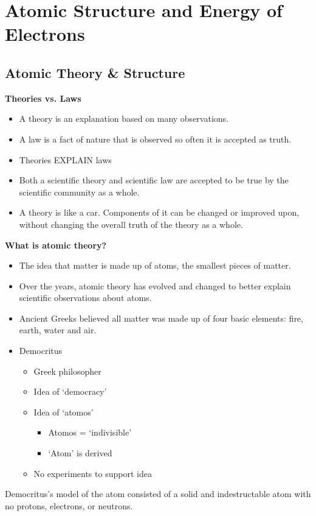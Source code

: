 \documentclass[../hchem.tex]{subfiles}
\begin{document}
\chapter{Atomic Structure and Energy of Electrons}
\section{Atomic Theory \& Structure}
\textbf{Theories vs. Laws}
\begin{itemize}
    \item A theory is an explanation based on many observations.
    \item A law is a fact of nature that is observed so often it is accepted as truth.
    \item Theories EXPLAIN laws
\end{itemize}
\begin{itemize}
    \item Both a scientific theory and scientific law are accepted to be true by the scientific community as a whole.
    \item A theory is like a car. Components of it can be changed or improved upon, without changing the overall truth of the theory as a whole.
\end{itemize}

\textbf{What is atomic theory?}
\begin{itemize}
    \item The idea that matter is made up of atoms, the smallest pieces of matter.
    \item Over the years, atomic theory has evolved and changed to better explain scientific observations about atoms.
\end{itemize}

\begin{itemize}
    \item Ancient Greeks believed all matter was made up of four basic elements: fire, earth, water and air.
    \item Democritus 
    \begin{itemize}
        \item Greek philosopher
        \item Idea of `democracy'
        \item Idea of `atomos'
        \begin{itemize}
            \item Atomos = `indivisible'
            \item `Atom' is derived 
        \end{itemize}
        \item No experiments to support idea
    \end{itemize}
\end{itemize}
Democritus's model of the atom consisted of a solid and indestructable atom with no protons, electrons, or neutrons.
\end{document}
